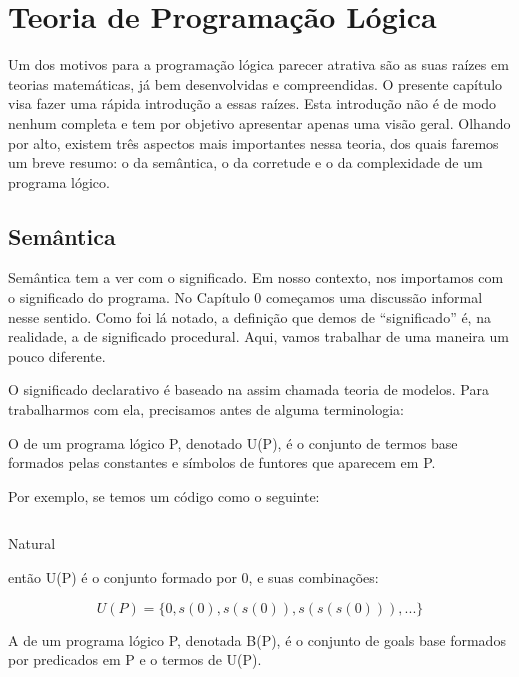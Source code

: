\documentclass{article}
\begin{document}
\section{Teoria de Programação Lógica}

Um dos motivos para a programação lógica parecer atrativa são as suas
raízes em teorias matemáticas, já bem desenvolvidas e compreendidas. O
presente capítulo visa fazer uma rápida introdução a essas
raízes. Esta introdução não é de modo nenhum completa e tem por
objetivo apresentar apenas uma visão geral. Olhando por alto, existem
três aspectos mais importantes nessa teoria, dos quais faremos um
breve resumo: o da semântica, o da corretude e o da complexidade de um
programa lógico.

\subsection{Semântica}
Semântica tem a ver com o significado. Em nosso contexto, nos
importamos com o significado do programa. No Capítulo 0 %
começamos uma discussão informal nesse sentido. Como foi lá notado, a
definição que demos de ``significado'' é, na realidade, a de
significado procedural. Aqui, vamos trabalhar de uma maneira um pouco
diferente.

O significado declarativo é baseado na assim chamada teoria de
modelos. Para trabalharmos com ela, precisamos antes de alguma
terminologia:

\begin{definition} O  de um programa
  lógico P, denotado U(P), é o conjunto de termos base formados pelas
  constantes e símbolos de funtores que aparecem em P. 
\end{definition}

Por exemplo, se temos um código como o seguinte:

\begin{listing}
  \inputminted{prolog}{../Exemplos/Cap2/prog1_natural.pl}
  \caption{Natural}\label{lst:natural}
\end{listing}

\noindent então U(P) é o conjunto formado por 0,
 e suas combinações:

\[
U(P) = \{0, s(0), s(s(0)), s(s(s(0))), ...\}
\]

\begin{definition} A  de um programa lógico
  P, denotada B(P), é o conjunto de goals base formados por predicados
  em P e o termos de U(P). 
\end{definition}
\end{document}
